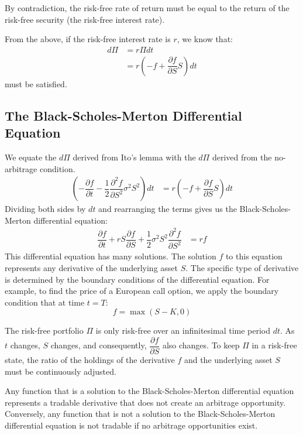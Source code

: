 \documentclass[uplatex]{jsarticle}
\begin{document}
By contradiction, the risk-free rate of return must be equal to the return of the risk-free security (the risk-free interest rate).

From the above, if the risk-free interest rate is $r$, we know that:
\begin{align}
	d \Pi & = r \Pi dt \\
	& = r \left( - f + \dfrac{\partial f}{\partial S} S \right) dt
\end{align}
must be satisfied.

\subsection{The Black-Scholes-Merton Differential Equation}

We equate the $d \Pi$ derived from Ito's lemma with the $d \Pi$ derived from the no-arbitrage condition.
\begin{align}
	\left( - \dfrac{\partial f}{\partial t} - \dfrac{1}{2} \dfrac{\partial^{2} f}{\partial S^{2}} \sigma^{2} S^{2} \right) dt & = r \left( - f + \dfrac{\partial f}{\partial S} S \right) dt
\end{align}
Dividing both sides by $dt$ and rearranging the terms gives us the Black-Scholes-Merton differential equation:
\begin{align}
	\dfrac{\partial f}{\partial t} + rS \dfrac{\partial f}{\partial S} + \dfrac{1}{2} \sigma^{2} S^{2} \dfrac{\partial^{2} f}{\partial S^{2}} & = rf
\end{align}
This differential equation has many solutions. The solution $f$ to this equation represents any derivative of the underlying asset $S$. The specific type of derivative is determined by the boundary conditions of the differential equation. For example, to find the price of a European call option, we apply the boundary condition that at time $t=T$:
$$
	f = \max (S-K,0)
$$

\bigskip

The risk-free portfolio $\Pi$ is only risk-free over an infinitesimal time period $dt$. As $t$ changes, $S$ changes, and consequently, $\dfrac{\partial f}{\partial S}$ also changes. To keep $\Pi$ in a risk-free state, the ratio of the holdings of the derivative $f$ and the underlying asset $S$ must be continuously adjusted.

\bigskip

Any function that is a solution to the Black-Scholes-Merton differential equation represents a tradable derivative that does not create an arbitrage opportunity. Conversely, any function that is not a solution to the Black-Scholes-Merton differential equation is not tradable if no arbitrage opportunities exist.
\end{document}
